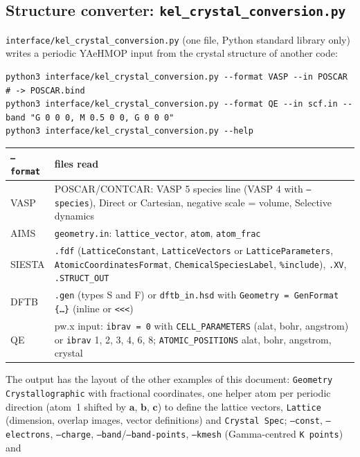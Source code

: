 \documentclass[11pt,a4paper]{article}
\newcommand{\file}[1]{\texttt{#1}}
\newcommand{\opt}[1]{\texttt{#1}}
\begin{document}
\subsection{Structure converter: \file{kel\_crystal\_conversion.py}}\label{sec:kelconv}
\file{interface/kel\_crystal\_conversion.py} (one file, Python standard library only) writes a periodic
YAeHMOP input from the crystal structure of another code:
\begin{lstlisting}[style=sh]
python3 interface/kel_crystal_conversion.py --format VASP --in POSCAR      # -> POSCAR.bind
python3 interface/kel_crystal_conversion.py --format QE --in scf.in --band "G 0 0 0, M 0.5 0 0, G 0 0 0"
python3 interface/kel_crystal_conversion.py --help
\end{lstlisting}
\begin{center}\small
\begin{tabularx}{\textwidth}{l >{\raggedright\arraybackslash}X}
\toprule
\texttt{--format} & files read \\
\midrule
VASP & POSCAR/CONTCAR: VASP 5 species line (VASP 4 with \opt{--species}), Direct or Cartesian, negative scale = volume, Selective dynamics \\
AIMS & \file{geometry.in}: \texttt{lattice\_vector}, \texttt{atom}, \texttt{atom\_frac} \\
SIESTA & \file{.fdf} (\texttt{LatticeConstant}, \texttt{LatticeVectors} or \texttt{LatticeParameters}, \texttt{AtomicCoordinatesFormat}, \texttt{ChemicalSpeciesLabel}, \texttt{\%include}), \file{.XV}, \file{.STRUCT\_OUT} \\
DFTB & \file{.gen} (types S and F) or \file{dftb\_in.hsd} with \texttt{Geometry = GenFormat \{\ldots\}} (inline or \texttt{<<<}) \\
QE & pw.x input: \texttt{ibrav = 0} with \texttt{CELL\_PARAMETERS} (alat, bohr, angstrom) or \texttt{ibrav} 1, 2, 3, 4, 6, 8; \texttt{ATOMIC\_POSITIONS} alat, bohr, angstrom, crystal \\
\bottomrule
\end{tabularx}
\end{center}
The output has the layout of the other examples of this document: \texttt{Geometry Crystallographic}
with fractional coordinates, one helper atom per periodic direction (atom~1 shifted by $\mathbf{a}$,
$\mathbf{b}$, $\mathbf{c}$) to define the lattice vectors, \texttt{Lattice} (dimension, overlap images,
vector definitions) and \texttt{Crystal Spec}; \opt{--const}, \opt{--electrons}, \opt{--charge},
\opt{--band}/\opt{--band-points}, \opt{--kmesh} (Gamma-centred \texttt{K points}) and
\end{document}
